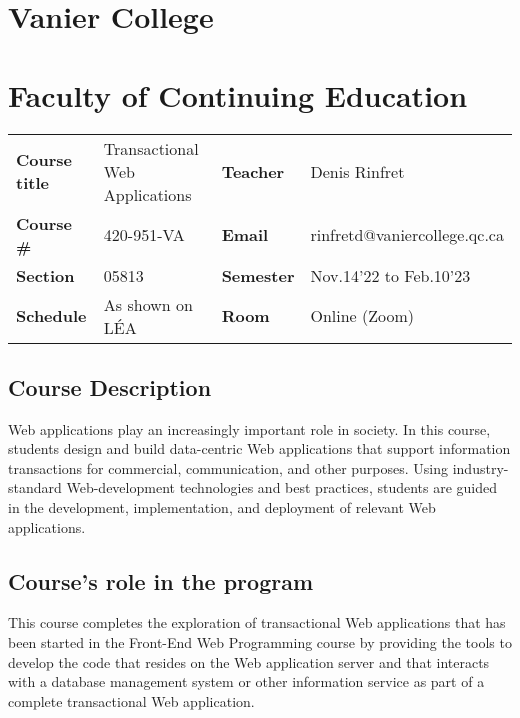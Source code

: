 \documentclass[
  10pt,
]{article}
\author{}
\date{}
\begin{document}
\begin{center}
\hypertarget{vanier-college}{%
\section*{Vanier College}\label{vanier-college}}

\hypertarget{faculty-of-continuing-education}{%
\section*{Faculty of Continuing Education}\label{faculty-of-continuing-education}}
\end{center}

\begin{longtable}[]{@{}llll@{}}
\toprule
\endhead
\textbf{Course title} & Transactional Web Applications &
\textbf{Teacher} & Denis Rinfret\tabularnewline
\textbf{Course \#} & 420-951-VA & \textbf{Email} &
rinfretd@vaniercollege.qc.ca\tabularnewline
\textbf{Section} & 05813 & \textbf{Semester} & Nov.14'22 to
Feb.10'23\tabularnewline
\textbf{Schedule} & As shown on LÉA & \textbf{Room} & Online
(Zoom)\tabularnewline
\bottomrule
\end{longtable}

\hypertarget{course-description}{%
\subsection*{Course Description}\label{course-description}}

Web applications play an increasingly important role in society. In this
course, students design and build data-centric Web applications that
support information transactions for commercial, communication, and
other purposes. Using industry-standard Web-development technologies and
best practices, students are guided in the development, implementation,
and deployment of relevant Web applications.

\hypertarget{courses-role-in-the-program}{%
\subsection*{Course's role in the
program}\label{courses-role-in-the-program}}

This course completes the exploration of transactional Web applications
that has been started in the Front-End Web Programming course by
providing the tools to develop the code that resides on the Web
application server and that interacts with a database management system
or other information service as part of a complete transactional Web
application.
\end{document}

